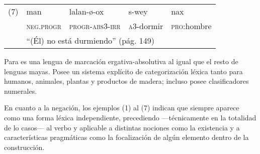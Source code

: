 {      %
      \noindent \begin{tabular}{lllll}
            (7) & man                                                     & lalan-ø-ox              & s-wey              & nax                 \\
                & \textsc{neg.progr}                                      & \textsc{progr-abs3-irr} & \textsc{a3}-dormir & \textsc{pro}:hombre \\
                & \multicolumn{4}{l}{“(Él) no está durmiendo” (pág. 149)}                                                                      \\
      \end{tabular} \vspace{0.3cm}
}

Para \textcolor{MidnightBlue}{
\citet{acateco}} es una lengua de marcación ergativa-absolutiva al igual que el resto de lenguas mayas. Posee un sistema explícito de categorización léxica tanto para humanos, animales, plantas y productos de madera; incluso posee clasificadores numerales.

En cuanto a la negación, los ejemplos (1) al (7) indican que siempre aparece como una forma léxica independiente, precediendo —técnicamente en la totalidad de lo casos— al verbo y aplicable a distintas nociones como la existencia y a características pragmáticas como la focalización de algún elemento dentro de la construcción.
